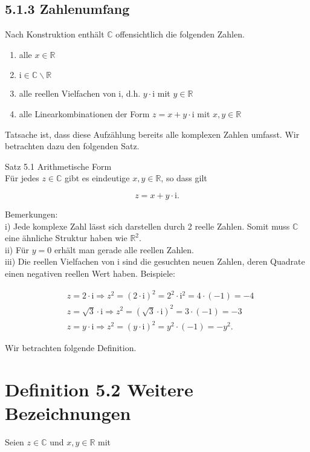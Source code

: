 \documentclass[10pt]{article}
\begin{document}
\subsection*{5.1.3 Zahlenumfang}
Nach Konstruktion enthält $\mathbb{C}$ offensichtlich die folgenden Zahlen.

\begin{enumerate}
  \item alle $x \in \mathbb{R}$
  \item $\mathrm{i} \in \mathbb{C} \backslash \mathbb{R}$
  \item alle reellen Vielfachen von i, d.h. $y \cdot \mathrm{i}$ mit $y \in \mathbb{R}$
  \item alle Linearkombinationen der Form $z=x+y \cdot \mathrm{i}$ mit $x, y \in \mathbb{R}$
\end{enumerate}

Tatsache ist, dass diese Aufzählung bereits alle komplexen Zahlen umfasst. Wir betrachten dazu den folgenden Satz.

Satz 5.1 Arithmetische Form\\
Für jedes $z \in \mathbb{C}$ gibt es eindeutige $x, y \in \mathbb{R}$, so dass gilt


\begin{equation*}
z=x+y \cdot \mathrm{i} . \tag{5.2}
\end{equation*}


Bemerkungen:\\
i) Jede komplexe Zahl lässt sich darstellen durch 2 reelle Zahlen. Somit muss $\mathbb{C}$ eine ähnliche Struktur haben wie $\mathbb{R}^{2}$.\\
ii) Für $y=0$ erhält man gerade alle reellen Zahlen.\\
iii) Die reellen Vielfachen von i sind die gesuchten neuen Zahlen, deren Quadrate einen negativen reellen Wert haben. Beispiele:


\begin{align*}
& z=2 \cdot \mathrm{i} \Rightarrow z^{2}=(2 \cdot \mathrm{i})^{2}=2^{2} \cdot \mathrm{i}^{2}=4 \cdot(-1)=-4  \tag{5.3}\\
& z=\sqrt{3} \cdot \mathrm{i} \Rightarrow z^{2}=(\sqrt{3} \cdot \mathrm{i})^{2}=3 \cdot(-1)=-3  \tag{5.4}\\
& z=y \cdot \mathrm{i} \Rightarrow z^{2}=(y \cdot \mathrm{i})^{2}=y^{2} \cdot(-1)=-y^{2} . \tag{5.5}
\end{align*}


Wir betrachten folgende Definition.

\section*{Definition 5.2 Weitere Bezeichnungen}
Seien $z \in \mathbb{C}$ und $x, y \in \mathbb{R}$ mit
\end{document}
